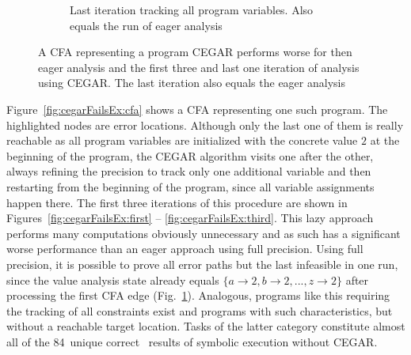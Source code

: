 \begin{figure}
\begin{subfigure}[b]{.48\textwidth}
\caption{Last iteration tracking all program variables. Also equals the run of eager analysis}
\label{fig:cegarFailsEx:eager}
\end{subfigure}
\caption{A CFA representing a program CEGAR performs worse for then eager analysis and the first three
and last one iteration of analysis using CEGAR. The last iteration also equals the eager analysis}
\label{fig:cegarFailsEx}
\end{figure}

Figure~\ref{fig:cegarFailsEx:cfa} shows a CFA representing one such program. The highlighted nodes are error locations.
Although only the last one of them is really reachable as all program variables are initialized with the concrete value $2$ at the beginning of the program,
the CEGAR algorithm visits one after the other, always refining the precision to track only one additional variable and then restarting
from the beginning of the program, since all variable assignments happen there.
The first three iterations of this procedure are shown in Figures~\ref{fig:cegarFailsEx:first} -- \ref{fig:cegarFailsEx:third}.
This lazy approach performs many computations obviously unnecessary and as such has a significant worse performance than an eager approach using full precision.
Using full precision, it is possible to prove all error paths but the last infeasible in one run, since the value analysis state already equals $\{ a \rightarrow 2, b \rightarrow 2, ..., z \rightarrow 2 \}$ after processing the first CFA edge (Fig.~\ref{fig:cegarFailsEx:eager}).
Analogous, programs like this requiring the tracking of all constraints exist and programs with such characteristics, but without a reachable target location.
Tasks of the latter category constitute almost all of the 84~unique correct \resultTrue\ results of symbolic execution without CEGAR.

